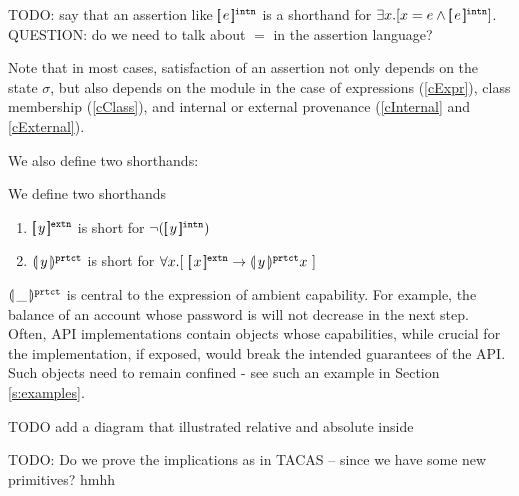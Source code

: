TODO: say that an assertion like ${[\!\![ \,e\, ]\!\!]^{{\texttt{intn}}}}$ is a shorthand for $\exists x. [ x=e \wedge {\ensuremath{[\!\![ \,e\, ]\!\!]^{{\texttt{intn}}}}}]$. QUESTION: do we need to talk about $=$ in the assertion language?

 Note that in most cases, satisfaction of an assertion not only depends on the state $\sigma$, but 
also depends on the module in the case of expressions (\ref{cExpr}), class membership
(\ref{cClass}), and internal or external provenance (\ref{cInternal} and \ref{cExternal}).

We also define two shorthands:

\begin{definition}
We define two shorthands

\begin{enumerate}
\item
$[\!\![ \,y\, ]\!\!]^{{\texttt{extn}}}$ is short for  $\neg([\!\![ \,y\, ]\!\!]^{{\texttt{intn}}})$
\item
${\llparenthesis \, y\, \rrparenthesis^{{\texttt{prtct}}}}$  is short for ${\forall x.[\ [\!\![ \,x\, ]\!\!]^{{\texttt{extn}}}  \rightarrow  {}{\ensuremath{\llparenthesis \, y\, \rrparenthesis^{{\texttt{prtct}}} x}}\ ]}$
\end{enumerate}
\end{definition}

${\llparenthesis \, \_\, \rrparenthesis^{{\texttt{prtct}}}}$  is central to the expression of ambient capability. For example, the balance of an account whose
  password is \inside  will not decrease in the next step.
  Often, API implementations contain objects whose capabilities, while  crucial for the implementation, if exposed,
would break the intended guarantees of the API. Such objects need to remain confined - see
such an example in Section \ref{s:examples}. 
 
 TODO add a diagram that illustrated relative and absolute inside

TODO: Do we prove the implications as in TACAS -- since we have some new primitives? hmhh

% 
%


